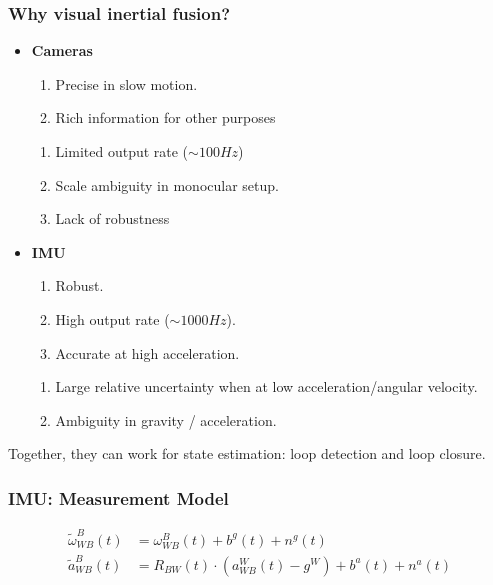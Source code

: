 \documentclass[a4paper,12 pt]{article}
\theoremstyle{definition}
\theoremstyle{remark}
\theoremstyle{definition}
\theoremstyle{definition}
\theoremstyle{definition}
\theoremstyle{remark}
\theoremstyle{definition}
\begin{document}
\subsubsection*{Why visual inertial fusion?}
\begin{itemize}
\item \textbf{Cameras}
\begin{enumerate}[+]
\item Precise in slow motion.
\item Rich information for other purposes
\end{enumerate}
\begin{enumerate}[-]
\item Limited output rate ($\sim 100 Hz$)
\item Scale ambiguity in monocular setup.
\item Lack of robustness
\end{enumerate}
\item \textbf{IMU}
\begin{enumerate}[+]
\item Robust.
\item High output rate ($\sim 1000 Hz$).
\item Accurate at high acceleration.
\end{enumerate}
\begin{enumerate}[-]
\item Large relative uncertainty when at low acceleration/angular velocity.
\item Ambiguity in gravity / acceleration.
\end{enumerate}
\end{itemize}
Together, they can work for state estimation: loop detection and loop closure.
\subsubsection*{IMU: Measurement Model}
\begin{equation}
\begin{split}
\tilde{\omega}_{WB}^B(t)&=\omega_{WB}^B(t)+b^g(t)+n^g(t)\\
\tilde{a}_{WB}^B(t)&=R_{BW}(t)\cdot \left(a_{WB}^W(t)-g^W \right) + b^a(t)+n^a(t)
\end{split}
\end{equation}
\end{document}
